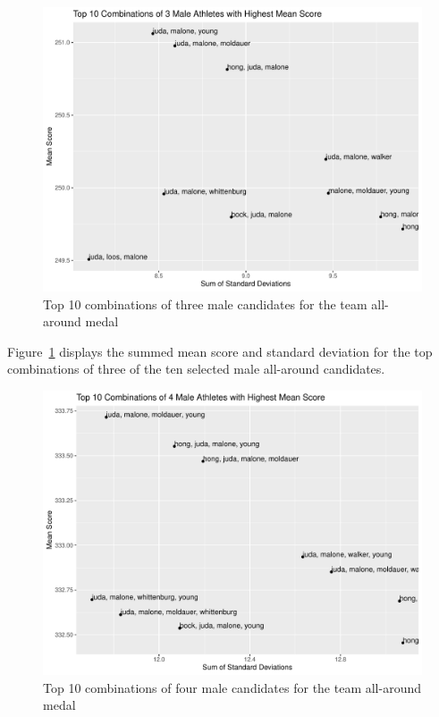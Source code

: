 \documentclass[12pt]{article}
\begin{document}
\begin{figure}
    \centering
    \includegraphics[scale=0.6]{MaleAthletesAA3.pdf}
    \caption{Top 10 combinations of three male candidates for the team all-around medal}
    \label{fig:MAA3}
  \end{figure}

  Figure~\ref{fig:MAA3} displays the summed mean score and standard deviation 
  for the top combinations of three of the ten selected male all-around candidates.
  
  \begin{figure}
    \centering
    \includegraphics[scale=0.6]{MaleAthletesAA4.pdf}
    \caption{Top 10 combinations of four male candidates for the team all-around medal}
    \label{fig:MAA4}
  \end{figure}
\end{document}
